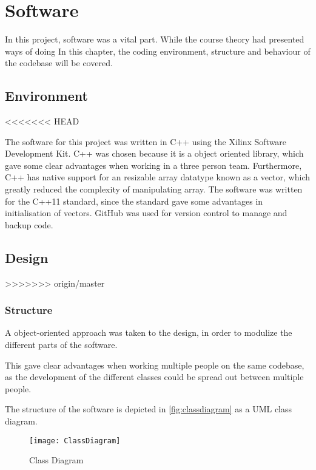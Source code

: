 \documentclass[Main]{subfiles}
\begin{document}
\section{Software} %
\label{sec:software}

	In this project, software was a vital part. 
	While the course theory had presented ways of doing 
	In this chapter, the coding environment, structure and behaviour of the codebase will be covered.
	
	\subsection{Environment} %
	\label{sub:software_environment}

<<<<<<< HEAD

		The software for this project was written in C++ using the Xilinx Software Development Kit.
		C++ was chosen because it is a object oriented library, which gave some clear advantages when working in a three person team.
		Furthermore, C++ has native support for an resizable array datatype known as a vector, which greatly reduced the complexity of manipulating array.
		The software was written for the C++11 standard, since the standard gave some advantages in initialisation of vectors.
		GitHub was used for version control	to manage and backup code.
		
		
		\subsection{Design} %
		\label{sub:software_design}

>>>>>>> origin/master
	
	\subsubsection{Structure} %
	\label{subsub:software_structure}
		A object-oriented approach was taken to the design, in order to modulize the different parts of the software. 
		
		This gave clear advantages when working multiple people on the same codebase, as the development of the different classes could be spread out between multiple people.
		
		The structure of the software is depicted in \autoref{fig:classdiagram} as a UML class diagram.
		
		\begin{figure}[H]
			\centering
			\texttt{[image: ClassDiagram]}
			\caption{Class Diagram}
			\label{fig:classdiagram}
		\end{figure}
\end{document}
